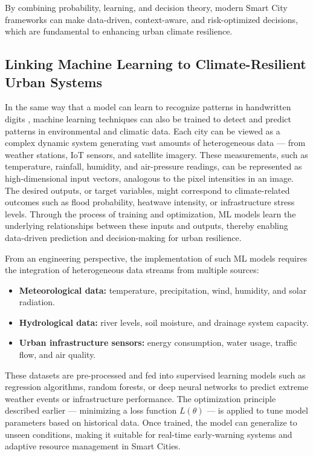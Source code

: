 \documentclass[12pt]{article}
\begin{document}
By combining probability, learning, and decision theory, modern Smart City frameworks can make data-driven, context-aware, 
and risk-optimized decisions, which are fundamental to enhancing urban climate resilience.


\subsection{Linking Machine Learning to Climate-Resilient Urban Systems}

In the same way that a model can learn to recognize patterns in handwritten digits \cite{bishop2006pattern}, machine learning techniques can also be trained to detect and predict patterns in environmental and climatic data. 
Each city can be viewed as a complex dynamic system generating vast amounts of heterogeneous data --- from weather stations, IoT sensors, and satellite imagery. 
These measurements, such as temperature, rainfall, humidity, and air-pressure readings, can be represented as high-dimensional input vectors, analogous to the pixel intensities in an image. 
The desired outputs, or target variables, might correspond to climate-related outcomes such as flood probability, heatwave intensity, or infrastructure stress levels. 
Through the process of training and optimization, ML models learn the underlying relationships between these inputs and outputs, thereby enabling data-driven prediction and decision-making for urban resilience.

From an engineering perspective, the implementation of such ML models requires the integration of heterogeneous data streams from multiple sources:
\begin{itemize}
    \item \textbf{Meteorological data:} temperature, precipitation, wind, humidity, and solar radiation.
    \item \textbf{Hydrological data:} river levels, soil moisture, and drainage system capacity.
    \item \textbf{Urban infrastructure sensors:} energy consumption, water usage, traffic flow, and air quality.
\end{itemize}

These datasets are pre-processed and fed into supervised learning models such as regression algorithms, random forests, or deep neural networks to predict extreme weather events or infrastructure performance. 
The optimization principle described earlier --- minimizing a loss function \( L(\theta) \) --- is applied to tune model parameters based on historical data. 
Once trained, the model can generalize to unseen conditions, making it suitable for real-time early-warning systems and adaptive resource management in Smart Cities.
\end{document}
